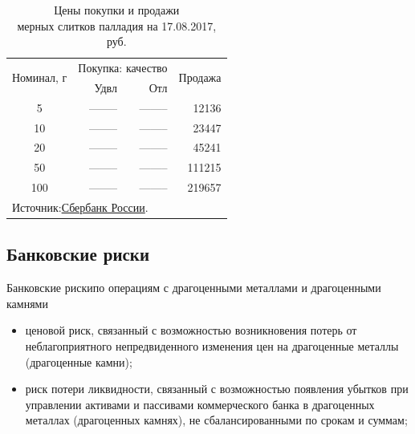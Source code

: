 \documentclass[_Banking_p3.tex]{subfiles}
\begin{document}
\begin{frame}
\begin{table}[htbp]
  \centering
  \caption{Цены покупки и продажи\\ мерных слитков палладия на 17.08.2017, руб.}
    \begin{tabular}{crrr}
    \toprule
   
	\multirow{2}[4]{*}{ Номинал, г} & \multicolumn{2}{c}{Покупка: качество} & 				\multirow{2}[4]{*}{Продажа} \\\cmidrule(lr){2-3}
          & Удвл  & Отл   &  \\
    \midrule
    5     & -------- & -------- & 12136 \\
    10    & -------- & -------- & 23447 \\
    20    & -------- & -------- & 45241 \\
    50    & -------- & -------- & 111215 \\
    100   & -------- & -------- & 219657 \\
    \bottomrule
    \multicolumn{4}{l}{Источник:\href{http://www.sberbank.ru/ru/person/contributions/values/metall}{Сбербанк России}.}
    \end{tabular}%
  \label{tab:palladium_bar_prices}%
\end{table}%

\end{frame}


\subsection{Банковские риски}
\begin{frame} {Банковские риски}{по операциям с драгоценными металлами и драгоценными камнями}
\begin{itemize}[<+->]
\item
ценовой риск, связанный с возможностью возникновения потерь от неблагоприятного непредвиденного изменения цен на драгоценные металлы (драгоценные камни);

\item 
риск потери ликвидности, связанный с возможностью появления убытков при управлении активами и пассивами коммерческого банка в драгоценных металлах (драгоценных камнях), не сбалансированными по срокам и суммам;
\end{itemize}
\end{frame}
\end{document}
